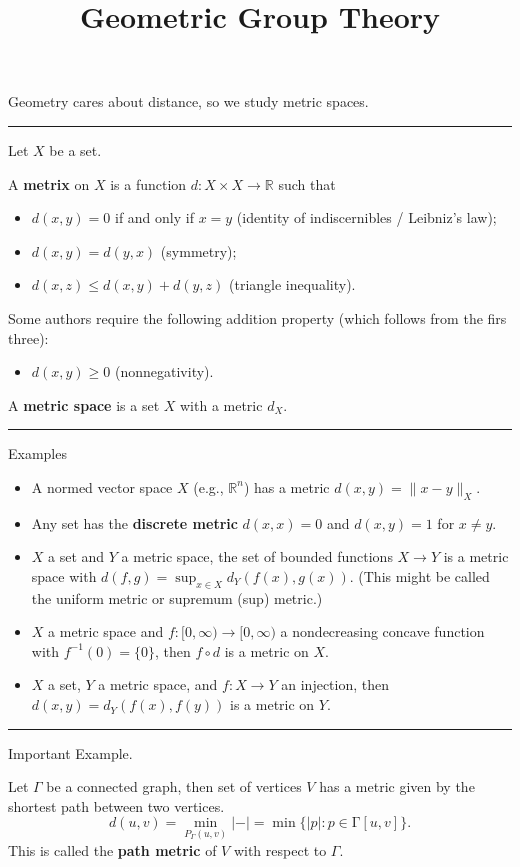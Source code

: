\documentclass[12pt]{article}
\title{Geometric Group Theory \\
    \large 
}
\author{}
\date{}
\newcommand{\keyword}[1]{\textbf{#1}}
\newcommand{\sepline}{\rule{\textwidth}{0.4pt}}
\theoremstyle{definition}
\newcommand{\R}{\mathbb{R}}
\newcommand{\<}{\left\langle}
\renewcommand{\>}{\right\rangle}
\begin{document}
Geometry cares about distance, so we study metric spaces.

\sepline

Let $X$ be a set.

A \keyword{metrix} on $X$ is a function $d : X \times X \to \R$ such that
\begin{itemize}
    \item $d(x, y) = 0$ if and only if $x = y$ (identity of indiscernibles / Leibniz's law);
    \item $d(x, y) = d(y, x)$ (symmetry);
    \item $d(x, z) \leq d(x, y) + d(y, z)$ (triangle inequality).
\end{itemize}

Some authors require the following addition property (which follows from the firs three):
\begin{itemize}
    \item $d(x, y) \geq 0$ (nonnegativity).
\end{itemize}

A \keyword{metric space} is a set $X$ with a metric $d_X$.

\sepline

Examples

\begin{itemize}
    \item A normed vector space $X$ (e.g., $\R^n$) has a metric $d(x, y) = \|x - y\|_X$.
    \item Any set has the \keyword{discrete metric} $d(x, x) = 0$ and $d(x, y) = 1$ for $x \ne y$.
    \item $X$ a set and $Y$ a metric space, the set of bounded functions $X \to Y$ is a metric space with $d(f, g) = \sup_{x \in X} d_Y(f(x), g(x))$.
    (This might be called the uniform metric or supremum (sup) metric.)
    \item $X$ a metric space and $f : [0, \infty) \to [0, \infty)$ a nondecreasing concave function with $f^{-1}(0) = \{0\}$, then $f \circ d$ is a metric on $X$.
    \item $X$ a set, $Y$ a metric space, and $f : X \to Y$ an injection, then $d(x, y) = d_Y(f(x), f(y))$ is a metric on $Y$.
\end{itemize}

\sepline

Important Example.

Let $\Gamma$ be a connected graph, then set of vertices $V$ has a metric given by the shortest path between two vertices.
\[
    d(u, v) = \min_{P_\Gamma(u, v)} |{-}| = \min\{|p| : p \in \mathrm \Gamma[u, v]\}.
\]
This is called the \keyword{path metric} of $V$ with respect to $\Gamma$.
\end{document}
